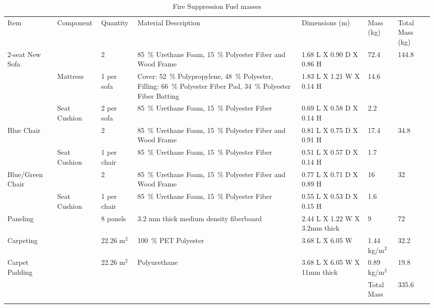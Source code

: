 \documentclass[12pt,oneside]{book}
\begin{document}
\begin{table}
	\centering
	\scriptsize
	\caption{Fire Suppression Fuel masses}
	\renewcommand{\tabcolsep}{1pt}
	\begin{tabular}{lllllll}
		\hline\noalign{\smallskip}
		Item               & Component		& Quantity		&  Material Description             							&  Dimensions (m)            	&  Mass (kg)  		& Total Mass (kg) \\
		\noalign{\smallskip}\hline\noalign{\smallskip}
		2-seat New Sofa    &				& 2				& 85~\% Urethane Foam, 15~\% Polyester Fiber and Wood Frame 	&  1.68 L X 0.90 D X 0.86 H  	&  72.4    			& 144.8 \\
		           	 	   & \multirow{2}{*}{{Mattress}}	    & \multirow{2}{*}{{1 per sofa}}	& \multirow{2}{*}{\parbox{5cm} {Cover: 52~\% Polypropylene, 48~\% Polyester, Filling: 66~\% Polyester Fiber Pad, 34~\% Polyester Fiber  Batting}} & \multirow{2}{*}{{1.83 L X 1.21 W X 0.14 H}}  & \multirow{2}{*}{{14.6}}     \\
		           	 	   &	            &               &                                                          		&                            	&             		& \\[.25cm]
			           	   & Seat Cushion	& 2 per sofa	& 85~\% Urethane Foam, 15~\% Polyester Fiber   				    &  0.69 L X 0.58 D X 0.14 H  	&  2.2     			& \\
		Blue Chair         &				& 2				& 85~\% Urethane Foam, 15~\% Polyester Fiber and Wood Frame   	&  0.81 L X 0.75 D X 0.91 H  	&  17.4    			& 34.8 \\
		    			   & Seat Cushion   & 1 per chair   & 85~\% Urethane Foam, 15~\% Polyester Fiber					&  0.51 L X 0.57 D X 0.14 H  	&  1.7    			& \\
		Blue/Green Chair   & 				& 2				& 85~\% Urethane Foam, 15~\% Polyester Fiber and Wood Frame     &  0.77 L X 0.71 D X 0.89 H  	&  16    			& 32 \\
		                   & Seat Cushion	& 1 per chair	& 85~\% Urethane Foam, 15~\% Polyester Fiber		            &  0.55 L X 0.53 D X 0.15 H  	&  1.6    			& \\
		Paneling           &				& 8 panels		& 3.2 mm thick medium density fiberboard                   		&  2.44 L X 1.22 W X 3.2mm thick&  9    			& 72 \\
		Carpeting          &				& 22.26 m$^2$	& 100~\% PET Polyester                  						&  3.68 L X 6.05 W  			&  1.44 kg/m$^2$	& 32.2 \\
		Carpet Padding     &				& 22.26 m$^2$	& Polyurethane                 	 								&  3.68 L X 6.05 W X 11mm thick &  0.89 kg/m$^2$    & 19.8 \\
		                   &                &               &                                                               &                               & Total Mass        & 335.6 \\
		\noalign{\smallskip}\hline
	\end{tabular}
	\label{tab:Fire_Suppression_Fuel_Masses}
\end{table}
\end{document}
